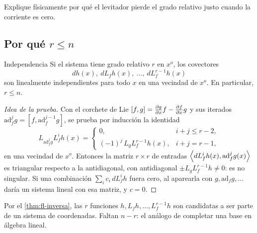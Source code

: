 \begin{pausa}
Explique físicamente por qué el levitador pierde el grado relativo justo cuando la corriente es cero.
\end{pausa}


\subsection{Por qué $r\le n$}

\begin{lema}[label=lem:fl-independencia]{Independencia \citep[Lema~4.1.1]{Isi95}}
Si el sistema tiene grado relativo $r$ en $x^o$, los covectores
\[
  dh(x),\ dL_fh(x),\ \dots,\ dL_f^{r-1}h(x)
\]
son linealmente independientes para todo $x$ en una vecindad de $x^o$. En particular, $r\le n$.
\end{lema}

\begin{proof}[Idea de la prueba]
Con el corchete de Lie $[f,g]=\frac{\partial g}{\partial x}f-\frac{\partial f}{\partial x}g$ y sus iterados $\mathrm{ad}_f^jg=[f,\mathrm{ad}_f^{j-1}g]$, se prueba por inducción la identidad
\[
  L_{\mathrm{ad}_f^jg}L_f^ih(x)=\begin{cases}0,& i+j\le r-2,\\ (-1)^j\,L_gL_f^{r-1}h(x),& i+j=r-1,\end{cases}
\]
en una vecindad de $x^o$. Entonces la matriz $r\times r$ de entradas $\left\langle dL_f^ih(x),\mathrm{ad}_f^jg(x)\right\rangle$ es triangular respecto a la antidiagonal, con antidiagonal $\pm L_gL_f^{r-1}h\neq0$: es no singular. Si una combinación $\sum_ic_i\,dL_f^ih$ fuera cero, al aparearla con $g,\mathrm{ad}_fg,\dots$ daría un sistema lineal con esa matriz, y $c=0$.
\end{proof}

Por el \cref{thm:fl-inversa}, las $r$ funciones $h,L_fh,\dots,L_f^{r-1}h$ son candidatas a ser parte de un sistema de coordenadas. Faltan $n-r$: el análogo de completar una base en álgebra lineal.
